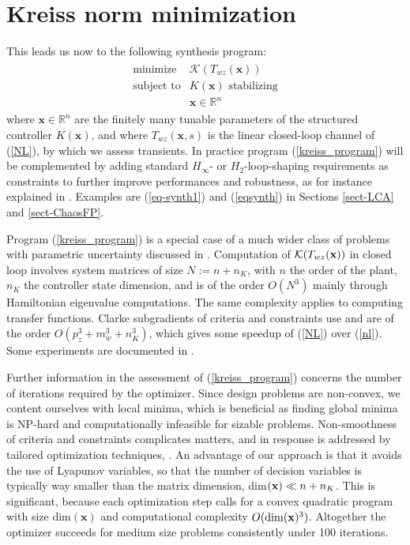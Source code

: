 \documentclass[12pt, a4paper,reqno]{amsart}
\newcommand{\x}{\mathbf x}
\theoremstyle{definition}
\newcounter{step}[algorithm]
\begin{document}
\section{Kreiss norm minimization}
\label{sect_optim}
This leads us now to the following synthesis program:
\begin{eqnarray}
\label{kreiss_program}
\begin{array}{ll}
\mbox{minimize} & \mathcal K(T_{wz}(\x)) \\
\mbox{subject to} 
& K(\x) \mbox{ stabilizing}\\
&\x\in \mathbb R^n
\end{array}
\end{eqnarray}
where $\x\in \mathbb R^n$ are the finitely many tunable parameters of the structured controller $K(\x)$,
and where $T_{wz}(\x,s)$ is the linear closed-loop channel of (\ref{NL}), by which we assess transients.
In practice
program (\ref{kreiss_program})  will be complemented by adding standard $H_\infty$- or $H_2$-loop-shaping requirements as constraints
to further improve performances and robustness, as for instance explained in
\cite{ApkarianNoll2021_OptBasedControl,AN2015,apkarianNoll2017worst}. Examples are 
(\ref{eq-synth1}) and (\ref{eqsynth}) in Sections 
\ref{sect-LCA} and \ref{sect-ChaosFP}.



Program (\ref{kreiss_program}) is a special case of a much wider class of problems with parametric uncertainty
discussed in \cite{AN2015,apkarianNoll2017worst}. 
%
Computation of $\mathcal K(T_{wz}({\bf x}))$ in closed loop
involves system
matrices of size $N:=n+n_K$, with $n$ the order of the plant, $n_K$ the controller state dimension, and is of the order $O(N^3)$ mainly
through Hamiltonian eigenvalue computations. The same complexity applies to computing transfer functions.
Clarke subgradients of criteria and constraints use 
\cite[Sect. IV, Prop. 1]{AN2015} and are of the order $O(p_z^3+m_w^3 + n_K^3)$, which gives some speedup of (\ref{NL})
over (\ref{nl}).
Some experiments are
documented in \cite{quenon2021control,an_kreiss}.


Further information in the assessment of (\ref{kreiss_program}) concerns
the number of iterations required by the optimizer.
Since design problems
are non-convex, we content ourselves with local minima, which is beneficial as finding global minima is NP-hard and
computationally infeasible for sizable problems. 
Non-smoothness
of criteria and constraints complicates matters, and in response
is addressed by tailored optimization techniques, 
\cite{apkarian2006nonsmooth,apkarian2006nonsmooth2}.
An advantage of our approach is that it
avoids the use of Lyapunov variables, so that the number of decision variables
is typically way smaller than the matrix dimension, dim$({\bf x}) \ll n+n_K$. This is
significant, 
because each optimization step calls for a convex quadratic program with size dim$(\x)$ and computational 
complexity
$O({\rm dim}(\x)^3)$. Altogether the optimizer
succeeds for medium size problems consistently under 100 iterations.
\end{document}
